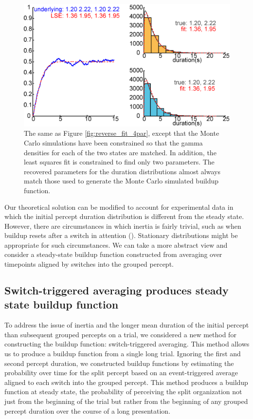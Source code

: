 \documentclass{frontiersSCNS} %
\begin{document}
\begin{figure}
	\centering
	\includegraphics[scale=.35]{../2par_reverse}
	\caption{The same as Figure \ref{fig:reverse_fit_4par}, except that the Monte Carlo simulations have been constrained so that the gamma densities for each of the two states are matched. In addition, the least squares fit is constrained to find only two parameters. The recovered parameters for the duration distributions almost always match those used to generate the Monte Carlo simulated buildup function.}
	\label{fig:2par_reverse_fit}
\end{figure}



Our theoretical solution can be modified to account for experimental data in which the initial percept duration distribution is different from the steady state. However, there are circumstances in which inertia is fairly trivial, such as when buildup resets after a switch in attention (\cite{Denham2010}). Stationary distributions might be appropriate for such circumstances. We can take a more abstract view and consider a steady-state buildup function constructed from averaging over timepoints aligned by switches into the grouped percept.

\subsection{Switch-triggered averaging produces steady state buildup function}

To address the issue of inertia and the longer mean duration of the initial percept than subsequent grouped percepts on a trial, we considered a new method for constructing the buildup function: switch-triggered averaging. This method allows us to produce a buildup function from a single long trial. Ignoring the first and second percept duration, we constructed buildup functions by estimating the probability over time for the split percept based on an event-triggered average aligned to each switch into the grouped percept. This method produces a buildup function at steady state, the probability of perceiving the split organization not just from the beginning of the trial but rather from the beginning of any grouped percept duration over the course of a long presentation. 
\end{document}

